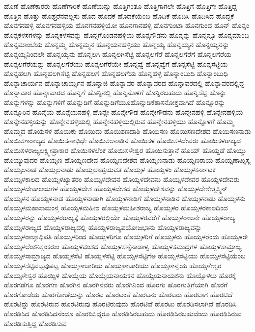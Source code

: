 {ಹೊಣೆ
ಹೊಣೆಕಾರರು
ಹೊಣೆಗಾರಿಕೆ
ಹೊಣೆಯನ್ನು
ಹೊತ್ತಿಗಂತೂ
ಹೊತ್ತಿಗಾಗಲೇ
ಹೊತ್ತಿಗೆ
ಹೊತ್ತಿಗೇ
ಹೊತ್ತಿದ್ದ
ಹೊತ್ತಿನ
ಹೊತ್ತು
ಹೊಥ್ತರೆನವಲ್ಲಸು
ಹೊದ
ಹೊದಕೆ
ಹೊದಕೆಯೆಂಬ
ಹೊದಿಕೆ
ಹೊದಿಸಿ
ಹೊದಿಸಿದ
ಹೊದ್ದಕೆ
ಹೊನಗನಹಳ್ಳಿ
ಹೊನಗನಹಳ್ಳಿಯ
ಹೊನಗನಹಳ್ಳಿಯೋ
ಹೊನಗಾನಹಳ್ಳಿ
ಹೊನಗುಂಟಾ
ಹೊನಗುಂದ
ಹೊನ್
ಹೊನ್ನಂ
ಹೊನ್ನಕಳಸಗಳನ್ನು
ಹೊನ್ನಕಳಸವನ್ನು
ಹೊನ್ನಗೊಂಡನಹಳ್ಳಿಯ
ಹೊನ್ನಗೌಡನು
ಹೊನ್ನನ್ನು
ಹೊನ್ನನ್ನೂ
ಹೊನ್ನಮಾಂಬ
ಹೊನ್ನಮಾಂಬೆಯ
ಹೊನ್ನಮ್ಮ
ಹೊನ್ನಮ್ಮನ
ಹೊನ್ನಯನಹಳ್ಳಿಯು
ಹೊನ್ನಯ್ಯ
ಹೊನ್ನಯ್ಯನ
ಹೊನ್ನಯ್ಯನನ್ನು
ಹೊನ್ನಯ್ಯನಿಂದಲೇ
ಹೊನ್ನಯ್ಯನು
ಹೊನ್ನಲಗಿ
ಹೊನ್ನಲಗಿಸೆಟ್ಟಿ
ಹೊನ್ನಲಗೆರೆ
ಹೊನ್ನಲಗೆರೆಗೆ
ಹೊನ್ನಲಗೆರೆಯ
ಹೊನ್ನಲಗೆರೆಯನ್ನು
ಹೊನ್ನಲಗೆರೆಯು
ಹೊನ್ನಲಗೆರೆಯೇ
ಹೊನ್ನವ್ವೆ
ಹೊನ್ನವ್ವೆಗೆ
ಹೊನ್ನಸೆಟ್ಟಿ
ಹೊನ್ನಸೆಟ್ಟಿಯ
ಹೊನ್ನಹಲಗಿ
ಹೊನ್ನಹಲಗಿಸೆಟ್ಟಿ
ಹೊನ್ನಹಲಗೆ
ಹೊನ್ನಹಲಗೆಯ
ಹೊನ್ನಹಳ್ಳ
ಹೊನ್ನಾಂಬುದಿ
ಹೊನ್ನಾಂಬುಧಿ
ಹೊನ್ನಾಚಾರ್ಯನ
ಹೊನ್ನಾಚಾರ್ಯ್ಯನ
ಹೊನ್ನಾಜಿ
ಹೊನ್ನಾವರ
ಹೊನ್ನಾವರದ
ಹೊನ್ನಾವರದಲ್ಲಿ
ಹೊನ್ನಾವರದಲ್ಲಿದ್ದ
ಹೊನ್ನಾವಾರ
ಹೊನ್ನಾವಾರದ
ಹೊನ್ನಿಗೆ
ಹೊನ್ನಿನಲ್ಲಿ
ಹೊನ್ನಿನೊಳಗೆ
ಹೊನ್ನಿರಬಹುದು
ಹೊನ್ನಿಸೆಟ್ಟಿ
ಹೊನ್ನು
ಹೊನ್ನುಗಳನ್ನು
ಹೊನ್ನುಗಳಿಗೆ
ಹೊನ್ನುಡಿಗೆ
ಹೊನ್ನುಡಿಗೆಯೂಹೊನ್ನುಡಿಕೆಶಾಸನೋಕ್ತವಾಗಿದೆ
ಹೊನ್ನೂರನ್ನು
ಹೊನ್ನೂರಿನ
ಹೊನ್ನೆಯ
ಹೊನ್ನೆಯನಹಳ್ಳಿ
ಹೊನ್ನೇ
ಹೊನ್ನೇಗೌಡ
ಹೊನ್ನೇಗೌಡನು
ಹೊನ್ನೇನಹಳ್ಳಿ
ಹೊನ್ನೇನಹಳ್ಳಿಯ
ಹೊನ್ನೇನಹಳ್ಳಿಯನ್ನು
ಹೊನ್ನೇನಹಳ್ಳಿಯಲ್ಲಿ
ಹೊನ್ನೇನಹಳ್ಳಿಯಲ್ಲಿರುವ
ಹೊನ್ನೇನಹಳ್ಳಿಯು
ಹೊನ್ನೊಳಗೆ
ಹೊಮ್ಮ
ಹೊಮ್ಮದ
ಹೊಯಸಳ
ಹೊಯಿಕು
ಹೊಯಿದು
ಹೊಯಿಶಣದಾಶಿ
ಹೊಯಿಸಣ
ಹೊಯಿಸಣದೇಶದ
ಹೊಯಿಸಣನಾಡು
ಹೊಯಿಸಣರಾಜ್ಯದ
ಹೊಯಿಸಣಾಭಿಧೇ
ಹೊಯಿಸಲನಾಡಿನ
ಹೊಯಿಸಳ
ಹೊಯಿಸಳದೇವರು
ಹೊಯಿಸಳರಾಜ್ಯದ
ಹೊಯಿಸಳರಾಜ್ಯಲಕ್ಷ್ಮೀಪ್ರಾಕಾರ
ಹೊಯಿಸಳಲೆಂಕ
ಹೊಯಿಸಳೇಶ್ವರ
ಹೊಯಿಸುತ್ತಾನೆ
ಹೊಯ್
ಹೊಯ್ದಡೆ
ಹೊಯ್ದು
ಹೊಯ್ಯುವುದರ
ಹೊಯ್ಸಣ
ಹೊಯ್ಸಣದೇವ
ಹೊಯ್ಸಣದೇಶದ
ಹೊಯ್ಸಣನಾಡು
ಹೊಯ್ಸಣರಾಯ
ಹೊಯ್ಸಣಾಖ್ಯಸ್ಯ
ಹೊಯ್ಸಲನಾಡ
ಹೊಯ್ಸಲನಾಡು
ಹೊಯ್ಸಲಾಹ್ವಯವತ
ಹೊಯ್ಸಳ
ಹೊಯ್ಸಳಂ
ಹೊಯ್ಸಳಕರ್ನಾಟಕ
ಹೊಯ್ಸಳಕಾಲದ
ಹೊಯ್ಸಳಖ್ಯಾತರಂ
ಹೊಯ್ಸಳದೇವನ
ಹೊಯ್ಸಳದೇವನು
ಹೊಯ್ಸಳದೇವರ
ಹೊಯ್ಸಳದೇವರು
ಹೊಯ್ಸಳದೇವಾಲಯಗಳ
ಹೊಯ್ಸಳದೇಶ
ಹೊಯ್ಸಳದೇಶದ
ಹೊಯ್ಸಳದೇಶವನ್ನು
ಹೊಯ್ಸಳದೇಶೇತ್ವಸ್ಮಿನ್
ಹೊಯ್ಸಳನ
ಹೊಯ್ಸಳನಾಡ
ಹೊಯ್ಸಳನಾಡಾಗಿ
ಹೊಯ್ಸಳನಾಡಿಗೆ
ಹೊಯ್ಸಳನಾಡಿನ
ಹೊಯ್ಸಳನಾಡು
ಹೊಯ್ಸಳನು
ಹೊಯ್ಸಳಮಹಾಸಾಮಂನ್ತ
ಹೊಯ್ಸಳಮಹೀಶ
ಹೊಯ್ಸಳಮಹೀಶರಾಜ್ಯ
ಹೊಯ್ಸಳರ
ಹೊಯ್ಸಳರಕಾಲದಿಂದ
ಹೊಯ್ಸಳರನ್ನು
ಹೊಯ್ಸಳರರಾಜ್ಯಕ್ಕೆ
ಹೊಯ್ಸಳರಲ್ಲಿಯೇ
ಹೊಯ್ಸಳರವರೆಗೆ
ಹೊಯ್ಸಳರಾಜನೇ
ಹೊಯ್ಸಳರಾಜ್ಯ
ಹೊಯ್ಸಳರಾಜ್ಯದ
ಹೊಯ್ಸಳರಾಜ್ಯದಲ್ಲಿ
ಹೊಯ್ಸಳರಾಜ್ಯಪಯೋಜಭಾನು
ಹೊಯ್ಸಳರಾಜ್ಯವನ್ನು
ಹೊಯ್ಸಳರಾಜ್ಯಾಧಿಪತಿ
ಹೊಯ್ಸಳರಿಂದ
ಹೊಯ್ಸಳರಿಗೂ
ಹೊಯ್ಸಳರಿಗೆ
ಹೊಯ್ಸಳರು
ಹೊಯ್ಸಳರೆಂದು
ಹೊಯ್ಸಳರೇ
ಹೊಯ್ಸಳಲೆಂಕನಿಸ್ಸಂಕರುಂ
ಹೊಯ್ಸಳವಂಶದ
ಹೊಯ್ಸಳಸಣ್ನೆನಾಡಾಳ್ವ
ಹೊಯ್ಸಳಸಮುದ್ರಗಳ
ಹೊಯ್ಸಳಸಾಮ್ರಾಜ್ಯ
ಹೊಯ್ಸಳಸಾಮ್ರಾಜ್ಯದ
ಹೊಯ್ಸಳಸೆಟಿ
ಹೊಯ್ಸಳಸೆಟ್ಟಿ
ಹೊಯ್ಸಳಸೆಟ್ಟಿಗೆಅ
ಹೊಯ್ಸಳಸೆಟ್ಟಿಯು
ಹೊಯ್ಸಳಸೆಟ್ಟಿಯೆಂಬ
ಹೊಯ್ಸಳಸೆಟ್ಟಿವಟ್ಟವುಪಟ್ಟ
ಹೊಯ್ಸಳಾಚಾರಿಯ
ಹೊಯ್ಸಳಾಚಾರಿಯು
ಹೊಯ್ಸಳಾನ್ವಯ
ಹೊಯ್ಸಳೇಶ್ವರ
ಹೊಯ್ಸಳೇಸ್ವರ
ಹೊಯ್ಸಿಳ
ಹೊಯ್ಸೆಯ
ಹೊಯ್ಸೆಯನಾಯಕನ
ಹೊಯ್ಸೆಯನಾಯಕನು
ಹೊಯ್ಸೊಳಲು
ಹೊರಕ್ಕೆ
ಹೊರಗಡೆಗೂ
ಹೊರಗಣ
ಹೊರಗಿನ
ಹೊರಗಿನವರು
ಹೊರಗಿನಿಂದ
ಹೊರಗು
ಹೊರಗುತ್ತಿಗೆಯಾಗಿ
ಹೊರಗೆ
ಹೊರಗೋಡೆಯ
ಹೊರಗೋಡೆಯನ್ನು
ಹೊರಟ
ಹೊರಟಂತೆ
ಹೊರಟನು
ಹೊರಟರು
ಹೊರಟಾಗ
ಹೊರಟಿದೆ
ಹೊರಟಿದ್ದು
ಹೊರಟಿರುವ
ಹೊರಟಿರುವು
ಹೊರಟಿರುವುದು
ಹೊರಟಿವೆ
ಹೊರಟು
ಹೊರಡಿಸಲಾಗಿದೆ
ಹೊರಡಿಸಿ
ಹೊರಡಿಸಿದ
ಹೊರಡಿಸಿದನೆಂದೂ
ಹೊರಡಿಸಿದ್ದರೂ
ಹೊರಡಿಸಿರಬಹುದು
ಹೊರಡಿಸಿರಬಹುದೆಂದು
ಹೊರಡಿಸಿರುವ
ಹೊರಡಿಸುತ್ತಿದ್ದ
ಹೊರಡಿಸುವ
}
